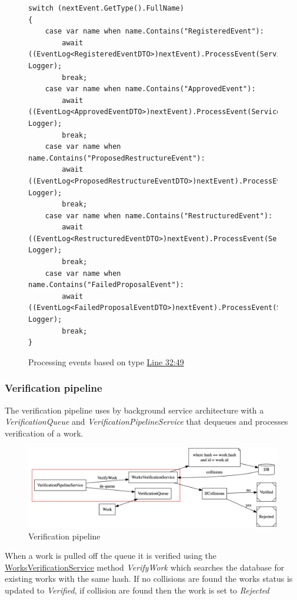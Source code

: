 \begin{figure}[H]
\caption{Processing events based on type \href{https://github.com/MrHarrisonBarker/CRPL/blob/main/CRPL.Web/Services/Background/EventProcessingService.cs}{Line 32:49}}
\centering
\begin{lstlisting}[language=CSharp]
switch (nextEvent.GetType().FullName)
{
	case var name when name.Contains("RegisteredEvent"):
		await ((EventLog<RegisteredEventDTO>)nextEvent).ProcessEvent(ServiceProvider, Logger);
		break;
	case var name when name.Contains("ApprovedEvent"):
		await ((EventLog<ApprovedEventDTO>)nextEvent).ProcessEvent(ServiceProvider, Logger);
		break;
	case var name when name.Contains("ProposedRestructureEvent"):
		await ((EventLog<ProposedRestructureEventDTO>)nextEvent).ProcessEvent(ServiceProvider, Logger);
		break;
	case var name when name.Contains("RestructuredEvent"):
		await ((EventLog<RestructuredEventDTO>)nextEvent).ProcessEvent(ServiceProvider, Logger);
		break;
	case var name when name.Contains("FailedProposalEvent"):
		await ((EventLog<FailedProposalEventDTO>)nextEvent).ProcessEvent(ServiceProvider, Logger);
		break;
}
\end{lstlisting}
\end{figure}

\subsubsection{Verification pipeline}

The verification pipeline uses by background service architecture with a \textit{VerificationQueue} and \textit{VerificationPipelineService} that dequeues and processes verification of a work. 

\begin{figure}[H]
\caption{Verification pipeline}
\centering
\includegraphics[width=\textwidth,height=\textheight,keepaspectratio]{images/operational/verification-pipe}
\end{figure}

When a work is pulled off the queue it is verified using the \href{https://github.com/MrHarrisonBarker/CRPL/blob/main/CRPL.Web/Services/WorksVerificationService.cs}{WorksVerificationService} method \textit{VerifyWork} which searches the database for existing works with the same hash. If no collisions are found the works status is updated to \textit{Verified}, if collision are found then the work is set to \textit{Rejected}

